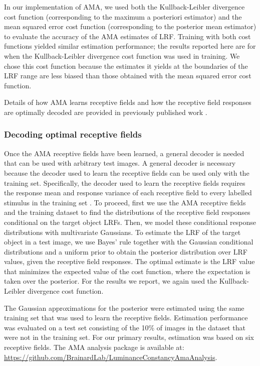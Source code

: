 \documentclass{jov}
\begin{document}
In our implementation of AMA, we used both the Kullback-Leibler divergence cost function (corresponding to the maximum a posteriori estimator) and the mean squared error cost function (corresponding to the posterior mean estimator) to evaluate the accuracy of the AMA estimates of LRF.
Training with both cost functions yielded similar estimation performance; the results reported here are for when the Kullback-Leibler divergence cost function was used in training.
We chose this cost function because the estimates it yields at the boundaries of the LRF range are less biased than those obtained with the mean squared error cost function.

Details of how AMA learns receptive fields and how the receptive field responses are optimally decoded are provided in previously published work \cite{geisler2009optimal,burge2017accuracy,jaini2017linking}.

\subsubsection*{Decoding optimal receptive fields}

Once the AMA receptive fields have been learned, a general decoder is needed that can be used with arbitrary test images.
A general decoder is necessary because the decoder used to learn the receptive fields can be used only with the training set. Specifically, the decoder used to learn the receptive fields requires the response mean and response variance of each receptive field to every labelled stimulus in the training set \cite{geisler2009optimal,burge2017accuracy}.
To proceed, first we use the AMA receptive fields and the training dataset to find the distributions of the receptive field responses conditional on the target object LRFs.
Then, we model these conditional response distributions with multivariate Gaussians.
To estimate the LRF of the target object in a test image, we use Bayes' rule together with the Gaussian conditional distributions and a uniform prior to obtain the posterior distribution over LRF values, given the receptive field responses.
The optimal estimate is the LRF value that minimizes the expected value of the cost function, where the expectation is taken over the posterior.
For the results we report, we again used the Kullback-Leibler divergence cost function.

The Gaussian approximations for the posterior were estimated using the same training set that was used to learn the receptive fields.
Estimation performance was evaluated on a test set consisting of the 10\% of images in the dataset that were not in the training set.
For our primary results, estimation was based on six receptive fields.
The AMA analysis package is available at: \href{https://github.com/BrainardLab/LuminanceConstancyAmaAnalysis}{https://github.com/BrainardLab/LuminanceConstancyAmaAnalysis}.
\end{document}
